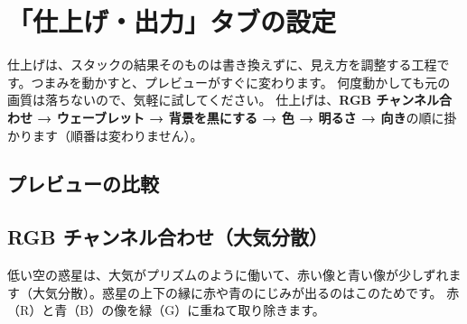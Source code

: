\chapter{「仕上げ・出力」タブの設定}\label{chap:finish}

仕上げは、スタックの結果そのものは書き換えずに、見え方を調整する工程です。つまみを動かすと、プレビューがすぐに変わります。
何度動かしても元の画質は落ちないので、気軽に試してください。
仕上げは、\textbf{RGB チャンネル合わせ → ウェーブレット → 背景を黒にする → 色 → 明るさ → 向き}の順に掛かります（順番は変わりません）。

\section{プレビューの比較}


\section{RGB チャンネル合わせ（大気分散）}

低い空の惑星は、大気がプリズムのように働いて、赤い像と青い像が少しずれます（大気分散）。惑星の上下の縁に赤や青のにじみが出るのはこのためです。
赤（R）と青（B）の像を緑（G）に重ねて取り除きます。


